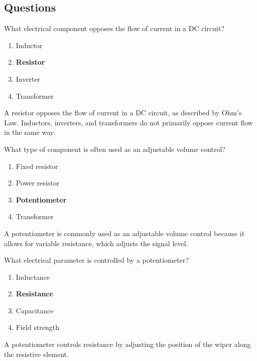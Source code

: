 \subsection*{Questions}
\begin{tcolorbox}[colback=gray!10!white,colframe=black!75!black,title={T6A01}]
    What electrical component opposes the flow of current in a DC circuit?
    \begin{enumerate}[label=\Alph*),noitemsep]
        \item Inductor
        \item \textbf{Resistor}
        \item Inverter
        \item Transformer
    \end{enumerate}
\end{tcolorbox}
A resistor opposes the flow of current in a DC circuit, as described by Ohm's Law. Inductors, inverters, and transformers do not primarily oppose current flow in the same way.


\begin{tcolorbox}[colback=gray!10!white,colframe=black!75!black,title={T6A02}]
    What type of component is often used as an adjustable volume control?
    \begin{enumerate}[label=\Alph*),noitemsep]
        \item Fixed resistor
        \item Power resistor
        \item \textbf{Potentiometer}
        \item Transformer
    \end{enumerate}
\end{tcolorbox}
A potentiometer is commonly used as an adjustable volume control because it allows for variable resistance, which adjusts the signal level.


\begin{tcolorbox}[colback=gray!10!white,colframe=black!75!black,title={T6A03}]
    What electrical parameter is controlled by a potentiometer?
    \begin{enumerate}[label=\Alph*),noitemsep]
        \item Inductance
        \item \textbf{Resistance}
        \item Capacitance
        \item Field strength
    \end{enumerate}
\end{tcolorbox}
A potentiometer controls resistance by adjusting the position of the wiper along the resistive element.

